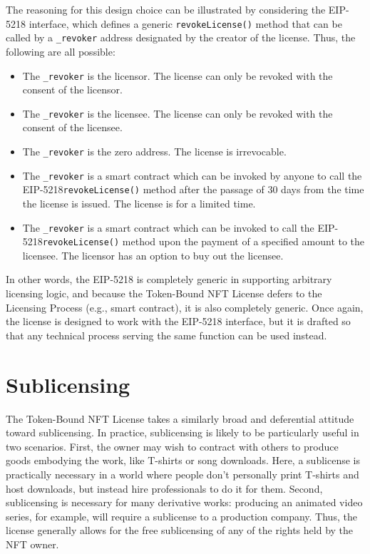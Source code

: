 \documentclass{article}
\newcommand{\eiplicense}{EIP-5218\xspace}
\newcommand{\iccclicense}{Token-Bound NFT License\xspace}
\renewcommand{\code}[1]{\colorbox{light-gray}{\texttt{#1}}}
\begin{document}
The reasoning for this design choice can be illustrated by considering the \eiplicense interface, which defines a generic \code{revokeLicense()} method that can be called by a \code{\_revoker} address designated by the creator of the license. Thus, the following are all possible:
\begin{itemize}
\item The \code{\_revoker} is the licensor. The license can only be revoked with the consent of the licensor.
\item The \code{\_revoker} is the licensee. The license can only be revoked with the consent of the licensee.
\item The \code{\_revoker} is the zero address. The license is irrevocable.
\item The \code{\_revoker} is a smart contract which can be invoked by anyone to call the \eiplicense \code{revokeLicense()} method after the passage of 30 days from the time the license is issued. The license is for a limited time.
\item The \code{\_revoker} is a smart contract which can be invoked to call the \eiplicense \code{revokeLicense()} method upon the payment of a specified amount to the licensee. The licensor has an option to buy out the licensee.
\end{itemize}
In other words, the \eiplicense is completely generic in supporting arbitrary licensing logic, and because the \iccclicense defers to the Licensing Process (e.g., smart contract), it is also completely generic. Once again, the license is designed to work with the \eiplicense interface, but it is drafted so that any technical process serving the same function can be used instead.

\section{Sublicensing}

The \iccclicense takes a similarly broad and deferential attitude toward sublicensing. In practice, sublicensing is likely to be particularly useful in two scenarios. First, the owner may wish to contract with others to produce goods embodying the work, like T-shirts or song downloads. Here, a sublicense is practically necessary in a world where people don't personally print T-shirts and host downloads, but instead hire professionals to do it for them. Second, sublicensing is necessary for many derivative works: producing an animated video series, for example, will require a sublicense to a production company. Thus, the license generally allows for the free sublicensing of any of the rights held by the NFT owner.
\end{document}
